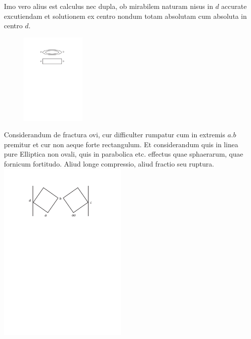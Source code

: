 Imo vero alius est calculus nec  dupla, ob mirabilem naturam nisus in $d$ accurate excutiendam et  solutionem ex centro nondum totam absolutam cum absoluta in centro $d$. 
\pend
\pstart%
\begin{figure}
\vspace{-5mm}\centering
\includegraphics[width=0.28\textwidth]{images/lh03705_210r-d5.pdf}\\
\end{figure}%
Considerandum de fractura\protect{} ovi, cur difficulter rumpatur cum in extremis $a. b$ premitur et cur non aeque forte rectangulum. Et considerandum quis in linea pure Elliptica\protect{} non ovali, quis in parabolica\protect{} etc. effectus quae sphaerarum, quae fornicum fortitudo. Aliud longe compressio, aliud fractio seu ruptura\protect{}.
\pend
\newpage%
\pstart%
\noindent%
\centering%
\includegraphics[width=0.47\textwidth]{images/lh03705_210r-d4.pdf}\\
